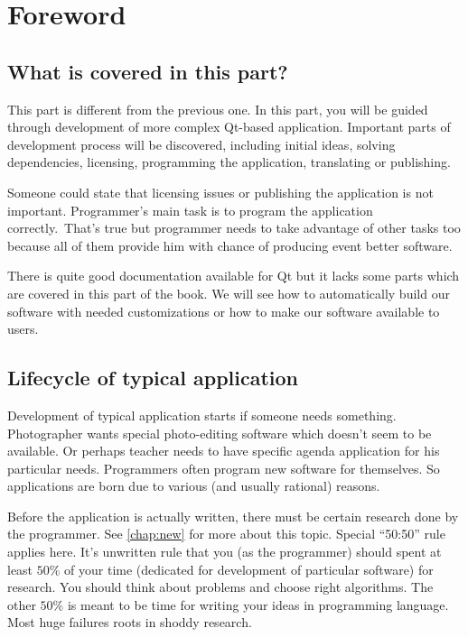 \chapter{Foreword}

\section{What is covered in this part?}
This part is different from the previous one. In this part, you will be guided through development of more complex Qt-based application. Important parts of development process will be discovered, including initial ideas, solving dependencies, licensing, programming the application, translating or publishing.

Someone could state that licensing issues or publishing the application is not important. Programmer's main task is to program the application correctly.\ That's true but programmer needs to take advantage of other tasks too because all of them provide him with chance of producing event better software.

There is quite good documentation \citep{various:qtdoc} available for Qt but it lacks some parts which are covered in this part of the book. We will see how to automatically build our software with needed customizations or how to make our software available to users.

\section{Lifecycle of typical application}
Development of typical application starts if someone needs something. Photographer wants special photo-editing software which doesn't seem to be available. Or perhaps teacher needs to have specific agenda application for his particular needs. Programmers often program new software for themselves. So applications are born due to various (and usually rational) reasons.

Before the application is actually written, there must be certain research done by the programmer. See \autoref{chap:new} for more about this topic. Special \enquote{50:50} rule applies here. It's unwritten rule that you (as the programmer) should spent at least $50\%$ of your time (dedicated for development of particular software) for research. You should think about problems and choose right algorithms. The other $50\%$ is meant to be time for writing your ideas in programming language. Most huge failures roots in shoddy research.

